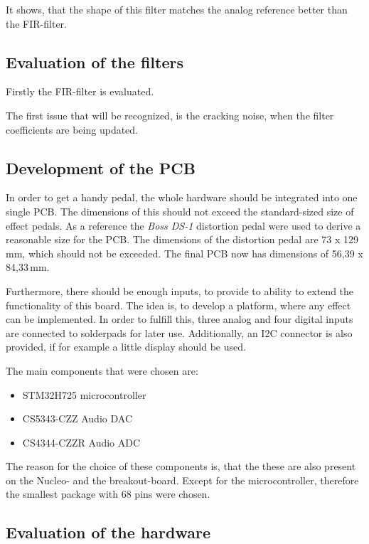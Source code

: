 It shows, that the shape of this filter matches the analog reference better than the \ac{FIR}-filter.

\subsection{Evaluation of the filters}

Firstly the \ac{FIR}-filter is evaluated.

The first issue that will be recognized, is the cracking noise, when the filter coefficients are being
updated.


\subsection{Development of the PCB}

In order to get a handy pedal, the whole hardware should be integrated into one single \ac{PCB}.
The dimensions of this should not exceed the standard-sized size of effect pedals. As a reference the
\textit{Boss DS-1} distortion pedal were used to derive a reasonable size for the \ac{PCB}. The dimensions of the
distortion pedal are 73 x 129\,mm, which should not be exceeded. The final \ac{PCB} now has dimensions of
56,39 x 84,33\,mm.

Furthermore, there should be enough inputs, to provide to ability to extend the functionality of this board.
The idea is, to develop a platform, where any effect can be implemented. In order to fulfill this, three analog and
four digital inputs are connected to solderpads for later use. Additionally, an \ac{I2C} connector is also
provided, if for example a little display should be used.

The main components that were chosen are:

\begin{itemize}
    \item STM32H725 microcontroller
    \item CS5343-CZZ Audio \ac{DAC}
    \item CS4344-CZZR Audio \ac{ADC}
\end{itemize}

The reason for the choice of these components is, that the these are also present on the Nucleo- and the
breakout-board. Except for the microcontroller, therefore the smallest package with 68 pins were chosen.

\subsection{Evaluation of the hardware}

